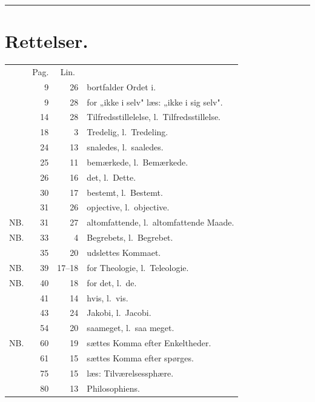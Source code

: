 \documentclass[12pt,a4paper]{book}
\begin{document}
\begin{center}\rule{0.28\linewidth}{0.4pt}\end{center}

\section*{Rettelser.}

\noindent
\begin{tabular}{@{}l r r l@{}}
    & \multicolumn{1}{c}{Pag.} & \multicolumn{1}{c}{Lin.} & \\
    & 9  & 26     & bortfalder Ordet i.\\
    & 9  & 28     & for „ikke i selv" læs: „ikke i sig selv".\\
    & 14 & 28     & Tilfredsstillelelse, l.\ Tilfredsstillelse.\\
    & 18 & 3      & Tredelig, l.\ Tredeling.\\
    & 24 & 13     & snaledes, l.\ saaledes.\\
    & 25 & 11     & bemærkede, l.\ Bemærkede.\\
    & 26 & 16     & det, l.\ Dette.\\
    & 30 & 17     & bestemt, l.\ Bestemt.\\
    & 31 & 26     & opjective, l.\ objective.\\
NB. & 31 & 27     & altomfattende, l.\ altomfattende Maade.\\
NB. & 33 & 4      & Begrebets, l.\ Begrebet.\\
    & 35 & 20     & udslettes Kommaet.\\
NB. & 39 & 17--18 & for Theologie, l.\ Teleologie.\\
NB. & 40 & 18     & for det, l.\ de.\\
    & 41 & 14     & hvis, l.\ vis.\\
    & 43 & 24     & Jakobi, l.\ Jacobi.\\
    & 54 & 20     & saameget, l.\ saa meget.\\
NB. & 60 & 19     & sættes Komma efter Enkeltheder.\\
    & 61 & 15     & sættes Komma efter spørges.\\
    & 75 & 15     & læs: Tilværelsessphære.\\
    & 80 & 13     & Philosophiens.\\
\end{tabular}
\end{document}
